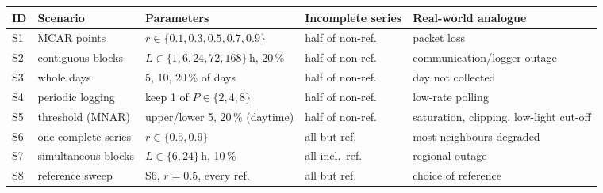 \begin{tabular}{lllll}
\toprule
ID & Scenario & Parameters & Incomplete series & Real-world analogue \\
\midrule
S1 & MCAR points & $r \in \{0.1,0.3,0.5,0.7,0.9\}$ & half of non-ref. & packet loss \\
S2 & contiguous blocks & $L \in \{1,6,24,72,168\}$\,h, 20\,\% & half of non-ref. & communication/logger outage \\
S3 & whole days & 5, 10, 20\,\% of days & half of non-ref. & day not collected \\
S4 & periodic logging & keep 1 of $P \in \{2,4,8\}$ & half of non-ref. & low-rate polling \\
S5 & threshold (MNAR) & upper/lower 5, 20\,\% (daytime) & half of non-ref. & saturation, clipping, low-light cut-off \\
S6 & one complete series & $r \in \{0.5,0.9\}$ & all but ref. & most neighbours degraded \\
S7 & simultaneous blocks & $L \in \{6,24\}$\,h, 10\,\% & all incl.\ ref. & regional outage \\
S8 & reference sweep & S6, $r{=}0.5$, every ref. & all but ref. & choice of reference \\
\bottomrule
\end{tabular}
